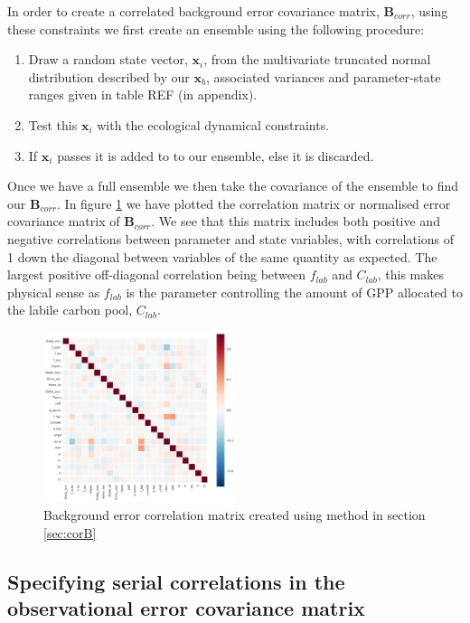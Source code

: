 \documentclass[11pt]{article}
\begin{document}
In order to create a correlated background error covariance matrix, $\textbf{B}_{corr}$, using these constraints we first create an ensemble using the following procedure:
\begin{enumerate}
\item Draw a random state vector, $\textbf{x}_i$, from the multivariate truncated normal distribution described by our $\textbf{x}_b$, associated variances and parameter-state ranges given in table REF (in appendix).
\item Test this $\textbf{x}_i$ with the ecological dynamical constraints.
\item If $\textbf{x}_i$ passes it is added to to our ensemble, else it is discarded.
\end{enumerate}
Once we have a full ensemble we then take the covariance of the ensemble to find our $\textbf{B}_{corr}$. In figure \ref{fig:Bcorr} we have plotted the correlation matrix or normalised error covariance matrix of $\textbf{B}_{corr}$. We see that this matrix includes both positive and negative correlations between parameter and state variables, with correlations of 1 down the diagonal between variables of the same quantity as expected. The largest positive off-diagonal correlation being between $f_{lab}$ and $C_{lab}$, this makes physical sense as $f_{lab}$ is the parameter controlling the amount of GPP allocated to the labile carbon pool, $C_{lab}$.

\begin{figure}[ht]
    \centering
    \includegraphics[width=0.5\textwidth]{b_edcNone_corrmat.png}
    \caption{Background error correlation matrix created using method in section \ref{sec:corB}}
    \label{fig:Bcorr}
\end{figure}

\subsection{Specifying serial correlations in the observational error covariance matrix} \label{sec:corR}
\end{document}
